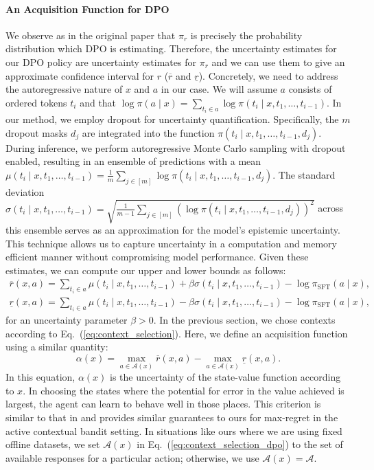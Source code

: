 \documentclass{article} \usepackage{iclr2023_conference,times}
\def\eqref#1{Eq.~(\ref{#1})}
\newcommand{\Actionspace}{\mathcal{A}}
\newcommand{\sftpolicy}{\pi_{\text{SFT}}}
\newcommand{\rewub}{\overline{r}}
\newcommand{\rewlb}{\underline{r}}
\newcommand{\add}[1]{#1}
\begin{document}
\paragraph{An Acquisition Function for DPO}
We observe as in the original paper that $\pi_r$ is precisely the probability distribution which DPO is estimating.
Therefore, the uncertainty estimates for our DPO policy are uncertainty estimates for $\pi_r$ and we can use them to give an approximate confidence interval for $r$ ($\rewub$ and $\rewlb$).
Concretely, we need to address the autoregressive nature of $x$ and $a$ in our case. We will assume $a$ consists of ordered tokens $t_i$ and that $\log\pi(a\mid x) = \sum_{t_i \in a}\log\pi(t_i\mid x, t_1, \dots, t_{i-1})$.
In our method, we employ dropout for uncertainty quantification.
Specifically, the $m$ dropout masks $d_j$ are integrated into the function $\pi(t_i\mid x, t_1, \dots, t_{i-1}, d_j)$.
During inference, we perform autoregressive Monte Carlo sampling with dropout enabled, resulting in an ensemble of predictions with a mean $\add{\mu(t_i\mid x, t_1, \dots, t_{i-1}) = \frac{1}{m}\sum_{j\in [m]}\log\pi(t_i \mid x, t_1, \dots, t_{i-1}, d_j)} $.
The standard deviation $\add{\sigma(t_i \mid x, t_1, \dots, t_{i-1})=\sqrt{\frac{1}{m - 1}\sum_{j \in [m]}\left(\log\pi(t_i \mid x, t_1, \dots, t_{i-1}, d_j)\right)^2}}$ across this ensemble serves as an approximation for the model's epistemic uncertainty.
This technique allows us to capture uncertainty in a computation and memory efficient manner without compromising model performance.
Given these estimates, we can compute our upper and lower bounds as follows:
\begin{align}
\rewub(x, a) = \sum_{t_i \in a}\mu(t_i\mid x, t_1, \dots, t_{i-1}) + \beta \sigma(t_i\mid x, t_1, \dots, t_{i-1})\add{-\log\sftpolicy(a\mid x)}, \\
\rewlb(x, a) = \sum_{t_i \in a}\mu(t_i\mid x, t_1, \dots, t_{i-1}) - \beta \sigma(t_i\mid x, t_1, \dots, t_{i-1})\add{-\log\sftpolicy(a\mid x)},
\end{align}
for an uncertainty parameter $\beta > 0$.
In the previous section, we chose contexts according to \eqref{eq:context_selection}. Here, we define an acquisition function using a similar quantity:
\begin{equation}
    \label{eq:context_selection_dpo}
    \alpha(x) = \max_{a\in\Actionspace\add{(x)}}\rewub(x, a) - \max_{a \in \Actionspace\add{(x)}}\rewlb(x, a).
\end{equation}
In this equation, $\alpha(x)$ is the uncertainty of the state-value function according to $x$. In choosing the states where the potential for error in the value achieved is largest, the agent can learn to behave well in those places.
This criterion is similar to that in \cite{li2023nearoptimal} and provides similar guarantees to ours for max-regret in the \add{active} contextual bandit setting.
In situations like ours where we are using fixed offline datasets, we set $\Actionspace\add{(x)}$ in \eqref{eq:context_selection_dpo} to the set of available responses \add{for a particular action; otherwise, we use $\Actionspace(x) = \Actionspace$}.
\end{document}
